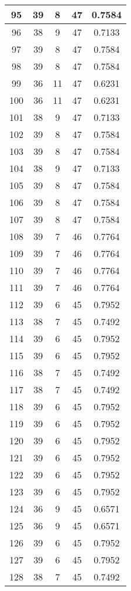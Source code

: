 \documentclass[letterpaper, 12pt]{article}
\begin{document}
\begin{longtable}{|c|c|c|c|c|}
95 & 39 & 8 & 47 & 0.7584 \\
\hline
96 & 38 & 9 & 47 & 0.7133 \\
\hline
97 & 39 & 8 & 47 & 0.7584 \\
\hline
98 & 39 & 8 & 47 & 0.7584 \\
\hline
99 & 36 & 11 & 47 & 0.6231 \\
\hline
100 & 36 & 11 & 47 & 0.6231 \\
\hline
101 & 38 & 9 & 47 & 0.7133 \\
\hline
102 & 39 & 8 & 47 & 0.7584 \\
\hline
103 & 39 & 8 & 47 & 0.7584 \\
\hline
104 & 38 & 9 & 47 & 0.7133 \\
\hline
105 & 39 & 8 & 47 & 0.7584 \\
\hline
106 & 39 & 8 & 47 & 0.7584 \\
\hline
107 & 39 & 8 & 47 & 0.7584 \\
\hline
108 & 39 & 7 & 46 & 0.7764 \\
\hline
109 & 39 & 7 & 46 & 0.7764 \\
\hline
110 & 39 & 7 & 46 & 0.7764 \\
\hline
111 & 39 & 7 & 46 & 0.7764 \\
\hline
112 & 39 & 6 & 45 & 0.7952 \\
\hline
113 & 38 & 7 & 45 & 0.7492 \\
\hline
114 & 39 & 6 & 45 & 0.7952 \\
\hline
115 & 39 & 6 & 45 & 0.7952 \\
\hline
116 & 38 & 7 & 45 & 0.7492 \\
\hline
117 & 38 & 7 & 45 & 0.7492 \\
\hline
118 & 39 & 6 & 45 & 0.7952 \\
\hline
119 & 39 & 6 & 45 & 0.7952 \\
\hline
120 & 39 & 6 & 45 & 0.7952 \\
\hline
121 & 39 & 6 & 45 & 0.7952 \\
\hline
122 & 39 & 6 & 45 & 0.7952 \\
\hline
123 & 39 & 6 & 45 & 0.7952 \\
\hline
124 & 36 & 9 & 45 & 0.6571 \\
\hline
125 & 36 & 9 & 45 & 0.6571 \\
\hline
126 & 39 & 6 & 45 & 0.7952 \\
\hline
127 & 39 & 6 & 45 & 0.7952 \\
\hline
128 & 38 & 7 & 45 & 0.7492 \\

\end{longtable}
\end{document}
